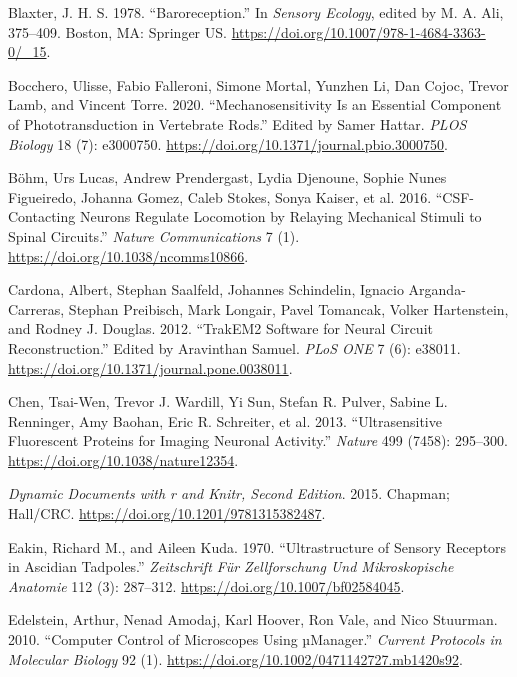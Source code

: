 \documentclass[
]{article}
\newlength{\cslhangindent}
\newlength{\cslentryspacingunit} %
\newenvironment{CSLReferences}[2] %
 {%
  \setlength{\parindent}{0pt}
  \ifodd #1
  \let\oldpar\par
  \def\par{\hangindent=\cslhangindent\oldpar}
  \fi
  \setlength{\parskip}{#2\cslentryspacingunit}
 }%
 {}
\begin{document}
\begin{CSLReferences}{1}{0}
\leavevmode{}%
Blaxter, J. H. S. 1978. {``Baroreception.''} In \emph{Sensory Ecology},
edited by M. A. Ali, 375--409. Boston, {MA}: Springer {US}.
\url{https://doi.org/10.1007/978-1-4684-3363-0/_15}.

\leavevmode{}%
Bocchero, Ulisse, Fabio Falleroni, Simone Mortal, Yunzhen Li, Dan Cojoc,
Trevor Lamb, and Vincent Torre. 2020. {``Mechanosensitivity Is an
Essential Component of Phototransduction in Vertebrate Rods.''} Edited
by Samer Hattar. \emph{PLOS Biology} 18 (7): e3000750.
\url{https://doi.org/10.1371/journal.pbio.3000750}.

\leavevmode{}%
Böhm, Urs Lucas, Andrew Prendergast, Lydia Djenoune, Sophie Nunes
Figueiredo, Johanna Gomez, Caleb Stokes, Sonya Kaiser, et al. 2016.
{``CSF-Contacting Neurons Regulate Locomotion by Relaying Mechanical
Stimuli to Spinal Circuits.''} \emph{Nature Communications} 7 (1).
\url{https://doi.org/10.1038/ncomms10866}.

\leavevmode{}%
Cardona, Albert, Stephan Saalfeld, Johannes Schindelin, Ignacio
Arganda-Carreras, Stephan Preibisch, Mark Longair, Pavel Tomancak,
Volker Hartenstein, and Rodney J. Douglas. 2012. {``TrakEM2 Software for
Neural Circuit Reconstruction.''} Edited by Aravinthan Samuel.
\emph{PLoS ONE} 7 (6): e38011.
\url{https://doi.org/10.1371/journal.pone.0038011}.

\leavevmode{}%
Chen, Tsai-Wen, Trevor J. Wardill, Yi Sun, Stefan R. Pulver, Sabine L.
Renninger, Amy Baohan, Eric R. Schreiter, et al. 2013. {``Ultrasensitive
Fluorescent Proteins for Imaging Neuronal Activity.''} \emph{Nature} 499
(7458): 295--300. \url{https://doi.org/10.1038/nature12354}.

\leavevmode{}%
\emph{Dynamic Documents with r and Knitr, Second Edition}. 2015.
Chapman; Hall/CRC. \url{https://doi.org/10.1201/9781315382487}.

\leavevmode{}%
Eakin, Richard M., and Aileen Kuda. 1970. {``Ultrastructure of Sensory
Receptors in Ascidian Tadpoles.''} \emph{Zeitschrift Für Zellforschung
Und Mikroskopische Anatomie} 112 (3): 287--312.
\url{https://doi.org/10.1007/bf02584045}.

\leavevmode{}%
Edelstein, Arthur, Nenad Amodaj, Karl Hoover, Ron Vale, and Nico
Stuurman. 2010. {``Computer Control of Microscopes Using µManager.''}
\emph{Current Protocols in Molecular Biology} 92 (1).
\url{https://doi.org/10.1002/0471142727.mb1420s92}.


\end{CSLReferences}
\end{document}
